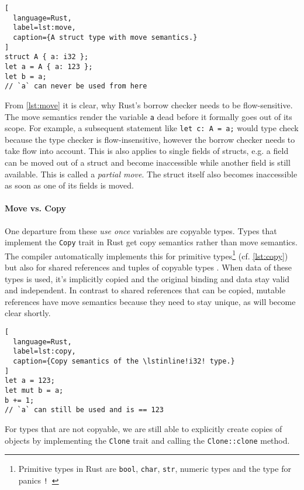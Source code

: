 \begin{lstlisting}[
  language=Rust,
  label=lst:move,
  caption={A struct type with move semantics.}
]
struct A { a: i32 };
let a = A { a: 123 };
let b = a;
// `a` can never be used from here
\end{lstlisting}

From \autoref{lst:move} it is clear, why Rust's borrow checker needs to be
flow-sensitive. The move semantics render the variable \lstinline!a! dead before
it formally goes out of its scope. For example, a subsequent statement like
\lstinline!let c: A = a;! would type check because the type checker is
flow-insensitive, however the borrow checker needs to take flow into account.
This is also applies to single fields of structs, e.g. a field can be moved
out of a struct and become inaccessible while another field is still available.
This is called a \emph{partial move}. The struct itself also becomes
inaccessible as soon as one of its fields is moved.

\paragraph{Move vs. Copy}

One departure from these \emph{use once} \citep{use-once} variables are copyable
types. Types that implement the \passthrough{\lstinline!Copy!} trait in Rust get
copy semantics rather than move semantics. The compiler automatically implements
this for primitive types\footnote{Primitive types in Rust are \lstinline!bool!,
\lstinline!char!, \lstinline!str!, numeric types and the type for panics
\texttt{!}~\cite{rustref}} (cf. \autoref{lst:copy}) but also for shared
references and tuples of copyable types \cite[section "Special types and
traits"]{rustref}. When data of these types is used, it's implicitly copied and
the original binding and data stay valid and independent. In contrast to shared
references that can be copied, mutable references have move semantics because
they need to stay unique, as will become clear shortly.

\begin{lstlisting}[
  language=Rust,
  label=lst:copy,
  caption={Copy semantics of the \lstinline!i32! type.}
]
let a = 123;
let mut b = a;
b += 1;
// `a` can still be used and is == 123
\end{lstlisting}

For types that are not copyable, we are still able to explicitly create
copies of objects by implementing the \passthrough{\lstinline!Clone!}
trait and calling the \passthrough{\lstinline!Clone::clone!} method.

